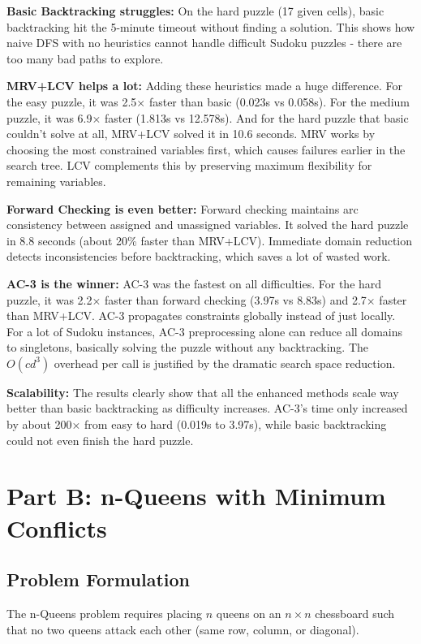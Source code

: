 \documentclass[letterpaper]{article}
\begin{document}
\textbf{Basic Backtracking struggles:} On the hard puzzle (17 given cells), basic backtracking hit the 5-minute timeout without finding a solution. This shows how naive DFS with no heuristics cannot handle difficult Sudoku puzzles - there are too many bad paths to explore.

\textbf{MRV+LCV helps a lot:} Adding these heuristics made a huge difference. For the easy puzzle, it was 2.5× faster than basic (0.023s vs 0.058s). For the medium puzzle, it was 6.9× faster (1.813s vs 12.578s). And for the hard puzzle that basic couldn't solve at all, MRV+LCV solved it in 10.6 seconds. MRV works by choosing the most constrained variables first, which causes failures earlier in the search tree. LCV complements this by preserving maximum flexibility for remaining variables.

\textbf{Forward Checking is even better:} Forward checking maintains arc consistency between assigned and unassigned variables. It solved the hard puzzle in 8.8 seconds (about 20\% faster than MRV+LCV). Immediate domain reduction detects inconsistencies before backtracking, which saves a lot of wasted work.

\textbf{AC-3 is the winner:} AC-3 was the fastest on all difficulties. For the hard puzzle, it was 2.2× faster than forward checking (3.97s vs 8.83s) and 2.7× faster than MRV+LCV. AC-3 propagates constraints globally instead of just locally. For a lot of Sudoku instances, AC-3 preprocessing alone can reduce all domains to singletons, basically solving the puzzle without any backtracking. The $O(cd^3)$ overhead per call is justified by the dramatic search space reduction.

\textbf{Scalability:} The results clearly show that all the enhanced methods scale way better than basic backtracking as difficulty increases. AC-3's time only increased by about 200× from easy to hard (0.019s to 3.97s), while basic backtracking could not even finish the hard puzzle.

\section{Part B: n-Queens with Minimum Conflicts}

\subsection{Problem Formulation}

The n-Queens problem requires placing $n$ queens on an $n \times n$ chessboard such that no two queens attack each other (same row, column, or diagonal).
\end{document}
